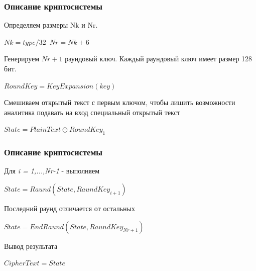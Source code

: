 \documentclass[10pt, typeface=serif(roman), pdf,hyperref={unicode}, aspectratio=169]{beamer}
\begin{document}
\begin{frame}
	\frametitle{Описание криптосистемы}
	\begin{description}
		\begin{block}
		{
			Определяем размеры Nk и Nr.\\
		}
	\item $ Nk = type/32 $~$ Nr = Nk + 6 $\\
		\end{block}
		\begin{block}
			{
				Генерируем $Nr+1$ раундовый ключ. Каждый раундовый ключ имеет размер 128 бит.\\
			}
		\item $ RoundKey = KeyExpansion(key) $\\
		\end{block}

		\begin{block}
			{
				Смешиваем открытый текст с первым ключом, чтобы лишить возможности аналитика подавать на вход специальный открытый текст\\
			}
		\item $ State = PlainText \oplus RoundKey_1 $\\
		\end{block}
	\end{description}
\end{frame}



\begin{frame}
	\frametitle{Описание криптосистемы}
	\begin{description}
		\begin{block}
			{
				Для \textit{i = 1,...,Nr-1} - выполняем
			}
			\item $ State = Raund(State, RaundKey_{i+1}) $\\
		\end{block}
		\begin{block}
			{
				Последний раунд отличается от остальных
			}
			\item $ State = EndRaund(State, RaundKey_{Nr+1}) $\\
		\end{block}
		\begin{block}
			{
				Вывод результата
			}
			\item $ CipherText = State $\\
		\end{block}
	\end{description}
\end{frame}
\end{document}
